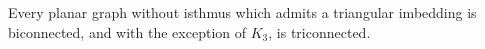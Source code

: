 Every planar graph without isthmus which admits a triangular imbedding is biconnected, and with the exception of $K_3$, is triconnected.
